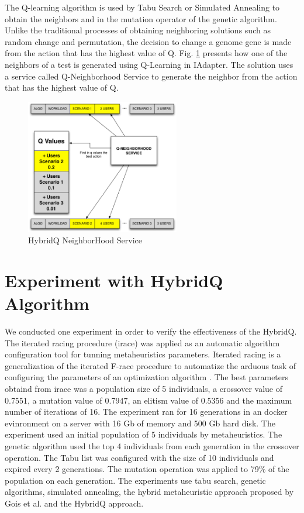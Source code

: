 \documentclass{report}
\begin{document}
The Q-learning algorithm is used by Tabu Search or Simulated Annealing to obtain the neighbors and in the mutation operator of the genetic algorithm. Unlike the traditional processes of obtaining neighboring solutions such as random change and permutation, the decision to change a genome gene is made from the action that has the highest value of Q. Fig. \ref{fig:neighservice} presents how one of the neighbors of a test is generated using Q-Learning in IAdapter. The solution uses a service called Q-Neighborhood Service to generate the neighbor from the action that has the highest value of Q.

\begin{figure}[h!]
\center
\includegraphics[width=0.6\textwidth]{./images/q-neighborservice.png}
\caption{HybridQ NeighborHood Service}
\label{fig:neighservice}
\end{figure}

\section{Experiment with HybridQ Algorithm}

We conducted one experiment in order to verify the effectiveness of the HybridQ. The iterated racing procedure (irace) was applied as an automatic algorithm configuration tool for tunning metaheuristics parameters. Iterated racing is a generalization of the iterated F-race procedure to automatize the arduous task of configuring the parameters of an optimization algorithm \cite{ManuelLopez-IbanezJeremieDubois-LacosteLesliePerezCaceresMauroBirattari2016}. The best parameters obtaind from irace was a population size of 5 individuals, a crossover value of 0.7551, a mutation value of 0.7947, an elitism value of 0.5356 and the maximum number of iterations of 16. The experiment ran for 16 generations in an docker evinronment on a server with 16 Gb of memory and 500 Gb hard disk. The experiment used an initial population of 5 individuals by metaheuristics. The genetic algorithm used the top 4 individuals from each generation in the crossover operation. The Tabu list was configured with the size of 10 individuals and expired every 2 generations.  The mutation operation was applied to 79\% of the population on each generation. The experiments use tabu search, genetic algorithms, simulated annealing, the hybrid metaheuristic approach proposed by Gois et al. \cite{Gois2016} and the HybridQ approach.
\end{document}
